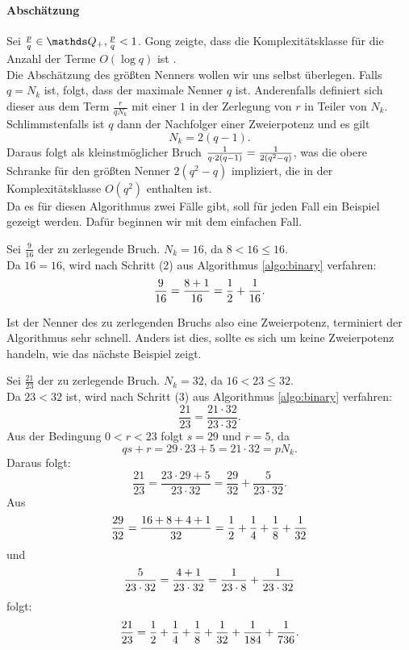\paragraph{Abschätzung}Sei $\frac{p}{q} \in \Q_+, \frac{p}{q} < 1$. Gong zeigte, dass die Komplexitätsklasse für die Anzahl der Terme $O(\log q)$ ist \cite[S. 12]{Gong1992}. \\
Die Abschätzung des größten Nenners wollen wir uns selbst überlegen. Falls $q = N_k$ ist, folgt, dass der maximale Nenner $q$ ist. Anderenfalls definiert sich dieser aus dem Term $\frac{r}{qN_k}$ mit einer $1$ in der Zerlegung von $r$ in Teiler von $N_k$. Schlimmstenfalls ist $q$ dann der Nachfolger einer Zweierpotenz und es gilt 
$$N_k = 2(q-1).$$
Daraus folgt als kleinstmöglicher Bruch $\frac{1}{q \cdot 2(q-1)} = \frac{1}{2(q^2-q)}$, was die obere Schranke für den größten Nenner $2(q^2-q)$ impliziert, die in der Komplexitätsklasse $O(q^2)$ enthalten ist.
\vspace{8mm}\\
Da es für diesen Algorithmus zwei Fälle gibt, soll für jeden Fall ein Beispiel gezeigt werden. Dafür beginnen wir mit dem einfachen Fall.

\begin{bsp}
	Sei $\frac{9}{16}$ der zu zerlegende Bruch. $N_k = 16$, da $8<16\leq16$.\\
	Da $16 = 16$, wird nach Schritt (2) aus Algorithmus \ref{algo:binary} verfahren:
	$$\frac{9}{16} = \frac{8+1}{16} = \frac{1}{2}+\frac{1}{16}.$$
\end{bsp}
Ist der Nenner des zu zerlegenden Bruchs also eine Zweierpotenz, terminiert der Algorithmus sehr schnell. Anders ist dies, sollte es sich um keine Zweierpotenz handeln, wie das nächste Beispiel zeigt.
\begin{bsp}
	Sei $\frac{21}{23}$ der zu zerlegende Bruch. $N_k = 32$, da $16 < 23 \leq 32$.\\
	Da $23<32$ ist, wird nach Schritt (3) aus Algorithmus \ref{algo:binary} verfahren:
	$$\frac{21}{23} = \frac{21 \cdot 32}{23 \cdot 32}.$$
	Aus der Bedingung $0<r<23$ folgt $s = 29$ und $r = 5$, da $$qs+r = 29 \cdot 23 + 5 = 21 \cdot 32 = p N_k.$$
	Daraus folgt:
	$$\frac{21}{23} = \frac{23 \cdot 29+5}{23 \cdot 32} = \frac{29}{32} + \frac{5}{23 \cdot 32}.$$
	Aus $$\frac{29}{32} = \frac{16+8+4+1}{32} = \frac{1}{2} + \frac{1}{4} + \frac{1}{8} + \frac{1}{32}$$ und $$\frac{5}{23 \cdot 32} = \frac{4+1}{23 \cdot 32} = \frac{1}{23 \cdot 8} + \frac{1}{23 \cdot 32}$$ folgt:
	$$\frac{21}{23} = \frac{1}{2} + \frac{1}{4} + \frac{1}{8} + \frac{1}{32} + \frac{1}{184} + \frac{1}{736}.$$
\end{bsp}